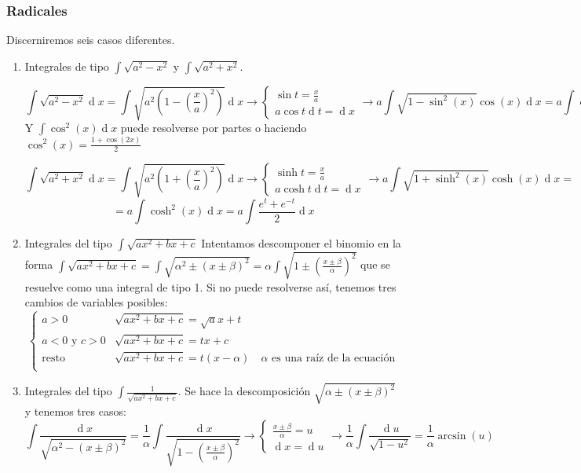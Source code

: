 \documentclass[a4paper]{article}
\renewcommand{\d}[1]{\ensuremath{\operatorname{d}\!{#1}}}
\begin{document}
\subsubsection*{Radicales}
Discerniremos seis casos diferentes.
\begin{enumerate}
	\item Integrales de tipo $\int\sqrt{a^2-x^2}$ y $\int\sqrt{a^2+x^2}$.
	
		\subitem $$\int\sqrt{a^2-x^2} \d{x} = \int\sqrt{a^2 \left( 1-\left(\frac{x}{a}\right)^2\right)}\d{x} \rightarrow
		\begin{cases}
		\sin t = \frac{x}{a}\\
		a\cos t \d{t} = \d{x}
		\end{cases} \rightarrow a\int\sqrt{ 1-\sin^2(x)}\cos(x)\d{x} = a\int\cos^2(x)\d{x}$$
		Y $\int\cos^2(x)\d{x}$ puede resolverse por partes o haciendo $\cos^2(x) = \frac{1+\cos(2x)}{2}$
		
		\subitem$$\int\sqrt{a^2+x^2} \d{x} = \int\sqrt{a^2 \left( 1+\left(\frac{x}{a}\right)^2\right)}\d{x} \rightarrow
		\begin{cases}
		\sinh t = \frac{x}{a}\\
		a\cosh t \d{t} = \d{x}
		\end{cases} \rightarrow a\int\sqrt{ 1+\sinh^2(x)}\cosh(x)\d{x} = $$
		$$ =  a\int\cosh^2(x)\d{x} =  a\int \frac{e^t+e^{-t}}{2}\d{x} $$
		
	\item Integrales del tipo $\int\sqrt{ax^2+bx+c}$
		\subitem Intentamos descomponer el binomio en la forma $\int\sqrt{ax^2+bx+c} = \int\sqrt{\alpha^2 \pm (x\pm \beta)^2} = \alpha\int\sqrt{1 \pm (\frac{x\pm \beta}{\alpha})^2}$ que se resuelve como una integral de tipo 1. 
		\subitem Si no puede resolverse así, tenemos tres cambios de variables posibles:
		$$\begin{cases}
		a>0 & \sqrt{ax^2+bx+c} = \sqrt{a}x+t\\
		a<0 \text{ y } c>0 & \sqrt{ax^2+bx+c} = tx+c\\
		\text{resto} & \sqrt{ax^2+bx+c} = t(x-\alpha) \quad \alpha \text{ es una raíz de la ecuación}\\
		\end{cases}$$
	\item Integrales del tipo $\int \frac{1}{\sqrt{ax^2+bx+c}}$. Se hace la descomposición $\sqrt{\alpha \pm (x\pm \beta)^2}$ y tenemos tres casos:
	 \subitem $$\int \frac{\d{x}}{\sqrt{\alpha^2-(x\pm\beta)^2}} = 
	 \frac{1}{\alpha}\int \frac{\d{x}}{\sqrt{1-\left(\frac{x\pm\beta}{\alpha}\right)^2}} \rightarrow 
	 \begin{cases}
	 \frac{x\pm\beta}{\alpha} = u\\\d{x}=\d{u}
	 \end{cases} \rightarrow \frac{1}{\alpha}\int\frac{\d{u}}{\sqrt{1-u^2}} = \frac{1}{\alpha}\arcsin(u) $$ 
	 

\end{enumerate}
\end{document}
